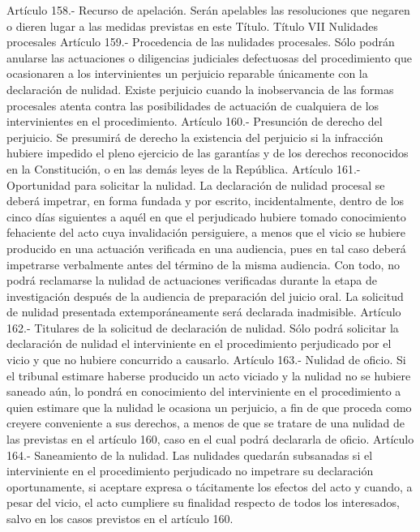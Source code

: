     Artículo 158.- Recurso de apelación. Serán apelables las resoluciones que negaren o dieren lugar a las medidas previstas en este Título.
    Título VII
    Nulidades procesales
    Artículo 159.- Procedencia de las nulidades procesales. Sólo podrán anularse las actuaciones o diligencias judiciales defectuosas del procedimiento que ocasionaren a los intervinientes un perjuicio reparable únicamente con la declaración de nulidad. Existe perjuicio cuando la inobservancia de las formas procesales atenta contra las posibilidades de actuación de cualquiera de los intervinientes en el procedimiento.
    Artículo 160.- Presunción de derecho del perjuicio. Se presumirá de derecho la existencia del perjuicio si la infracción hubiere impedido el pleno ejercicio de las garantías y de los derechos reconocidos en la Constitución, o en las demás leyes de la República.
    Artículo 161.- Oportunidad para solicitar la nulidad. La declaración de nulidad procesal se deberá impetrar, en forma fundada y por escrito, incidentalmente, dentro de los cinco días siguientes a aquél en que el perjudicado hubiere tomado conocimiento fehaciente del acto cuya invalidación persiguiere, a menos que el vicio se hubiere producido en una actuación verificada en una audiencia, pues en tal caso deberá impetrarse verbalmente antes del término de la misma audiencia. Con todo, no podrá reclamarse la nulidad de actuaciones verificadas durante la etapa de investigación después de la audiencia de preparación del juicio oral. La solicitud de nulidad presentada extemporáneamente será declarada inadmisible.
    Artículo 162.- Titulares de la solicitud de declaración de nulidad. Sólo podrá solicitar la declaración de nulidad el interviniente en el procedimiento perjudicado por el vicio y que no hubiere concurrido a causarlo.
    Artículo 163.- Nulidad de oficio. Si el tribunal estimare haberse producido un acto viciado y la nulidad no se hubiere saneado aún, lo pondrá en conocimiento del interviniente en el procedimiento a quien estimare que la nulidad le ocasiona un perjuicio, a fin de que proceda como creyere conveniente a sus derechos, a menos de que se tratare de una nulidad de las previstas en el artículo 160, caso en el cual podrá declararla de oficio.
    Artículo 164.- Saneamiento de la nulidad. Las nulidades quedarán subsanadas si el interviniente en el procedimiento perjudicado no impetrare su declaración oportunamente, si aceptare expresa o tácitamente los efectos del acto y cuando, a pesar del vicio, el acto cumpliere su finalidad respecto de todos los interesados, salvo en los casos previstos en el artículo 160.
